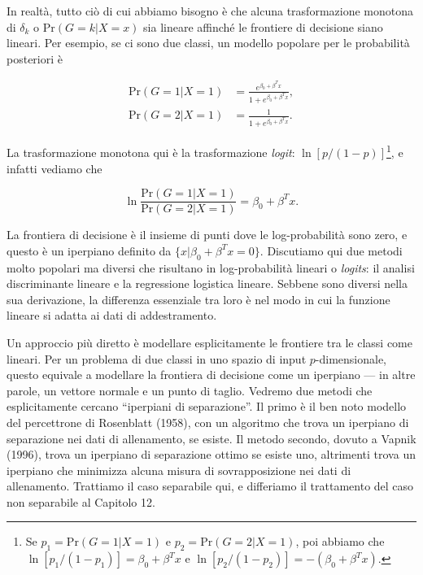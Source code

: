 \documentclass[11pt,openany]{book}
\newenvironment{nalign}{
    \begin{equation}
    \begin{aligned}
}{
    \end{aligned}
    \end{equation}
    \ignorespacesafterend
}
\begin{document}
In realtà, tutto ciò di cui abbiamo bisogno è che alcuna trasformazione monotona di $\delta_k$ o $\text{Pr}(G = k | X = x)$ sia lineare affinché le frontiere di decisione siano lineari. Per esempio, se ci sono due classi, un modello popolare per le probabilità posteriori è

\begin{nalign} \label{eq4-1}
\text{Pr}(G = 1 | X = 1) & = \frac{e^{\beta_0 + \beta^T x}}{1 + e^{\beta_0 + \beta^T x}},\\
\text{Pr}(G = 2 | X = 1) & = \frac{1}{1 + e^{\beta_0 + \beta^T x}}.
\end{nalign}

La trasformazione monotona qui è la trasformazione \textit{logit}: $\ln[p/(1 - p)]$\footnote{Se $p_1 = \text{Pr}(G = 1 | X = 1)$ e $p_2 = \text{Pr}(G = 2 | X = 1)$, poi abbiamo che $\ln[p_1/(1 - p_1)] = \beta_0 + \beta^T x$ e $\ln[p_2/(1 - p_2)] = - \left( \beta_0 + \beta^T x \right)$.}, e infatti vediamo che

\begin{equation}\label{eq4-2}
\ln \frac{\text{Pr}(G = 1 | X = 1)}{\text{Pr}(G = 2 | X = 1)} = \beta_0 + \beta^T x.
\end{equation}

La frontiera di decisione è il insieme di punti dove le log-probabilità sono zero, e questo è un iperpiano definito da $\{ x | \beta_0 + \beta^T x = 0 \}$. Discutiamo qui due metodi molto popolari ma diversi che risultano in log-probabilità lineari o \textit{logits}: il analisi discriminante lineare e la regressione logistica lineare. Sebbene sono diversi nella sua derivazione, la differenza essenziale tra loro è nel modo in cui la funzione lineare si adatta ai dati di addestramento.

Un approccio più diretto è modellare esplicitamente le frontiere tra le classi come lineari. Per un problema di due classi in uno spazio di input $p$-dimensionale, questo equivale a modellare la frontiera di decisione come un iperpiano --- in altre parole, un vettore normale e un punto di taglio. Vedremo due metodi che esplicitamente cercano ``iperpiani di separazione''. Il primo è il ben noto modello del percettrone di Rosenblatt (1958), con un algoritmo che trova un iperpiano di separazione nei dati di allenamento, se esiste. Il metodo secondo, dovuto a Vapnik (1996), trova un iperpiano di separazione ottimo se esiste uno, altrimenti trova un iperpiano che minimizza alcuna misura di sovrapposizione nei dati di allenamento. Trattiamo il caso separabile qui, e differiamo il trattamento del caso non separabile al Capitolo 12.
\end{document}
